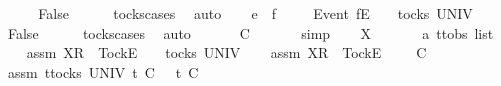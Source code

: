\ \ \isamarkupfalse%
\ \isamarkupfalse%
\ {\isachardoublequoteopen}False{\isachardoublequoteclose}\isanewline
\ \ \ \ \isamarkupfalse%
\ tocks{\isachardot}cases\ \isamarkupfalse%
\ auto\isanewline
{}\isamarkupfalse%
\isanewline
\ \ \isamarkupfalse%
\ e\ {\isasymrho}\ f\ {\isasymsigma}{\isacharprime}{\isacharprime}\isanewline
\ \ \isamarkupfalse%
\ {\isachardoublequoteopen}{\isacharbrackleft}Event\ f{\isacharbrackright}\isactrlsub E\ {\isacharhash}\ {\isasymsigma}{\isacharprime}{\isacharprime}\ {\isasymin}\ tocks\ UNIV{\isachardoublequoteclose}\isanewline
\ \ \isamarkupfalse%
\ \isamarkupfalse%
\ {\isachardoublequoteopen}False{\isachardoublequoteclose}\isanewline
\ \ \ \ \isamarkupfalse%
\ tocks{\isachardot}cases\ \isamarkupfalse%
\ auto\isanewline
\ \ \isamarkupfalse%
\ \isamarkupfalse%
\ {\isachardoublequoteopen}{\isasymrho}\ {\isasymlesssim}\isactrlsub C\ {\isasymsigma}{\isacharprime}{\isacharprime}{\isachardoublequoteclose}\isanewline
\ \ \ \ \isamarkupfalse%
\ simp\isanewline
{}\isamarkupfalse%
\isanewline
\ \ \isamarkupfalse%
\ X\ \isanewline
\ \ \isamarkupfalse%
\ {\isasymsigma}{\isacharprime}{\isacharprime}\ {\isacharcolon}{\isacharcolon}\ {\isachardoublequoteopen}{\isacharprime}a\ ttobs\ list{\isachardoublequoteclose}\isanewline
\ \ \isamarkupfalse%
\ assm{}{\isacharcolon}\ {\isachardoublequoteopen}{\isacharbrackleft}X{\isacharbrackright}\isactrlsub R\ {\isacharhash}\ {\isacharbrackleft}Tock{\isacharbrackright}\isactrlsub E\ {\isacharhash}\ {\isasymsigma}{\isacharprime}{\isacharprime}\ {\isasymin}\ tocks\ UNIV{\isachardoublequoteclose}\isanewline
\ \ \isamarkupfalse%
\ assm{}{\isacharcolon}\ {\isachardoublequoteopen}{\isacharbrackleft}X{\isacharbrackright}\isactrlsub R\ {\isacharhash}\ {\isacharbrackleft}Tock{\isacharbrackright}\isactrlsub E\ {\isacharhash}\ {\isasymsigma}{\isacharprime}{\isacharprime}\ {\isacharat}\ {\isasymsigma}{\isacharprime}\ {\isasymlesssim}\isactrlsub C\ {\isasymsigma}{\isachardoublequoteclose}\isanewline
\ \ \isamarkupfalse%
\ assm{}{\isacharcolon}\ {\isachardoublequoteopen}{\isasymforall}t{\isasymin}tocks\ UNIV{\isachardot}\ t\ {\isasymle}\isactrlsub C\ {\isasymsigma}\ {\isasymlongrightarrow}\ t\ {\isasymle}\isactrlsub C\ {\isacharbrackleft}{\isacharbrackright}{\isachardoublequoteclose}\isanewline
